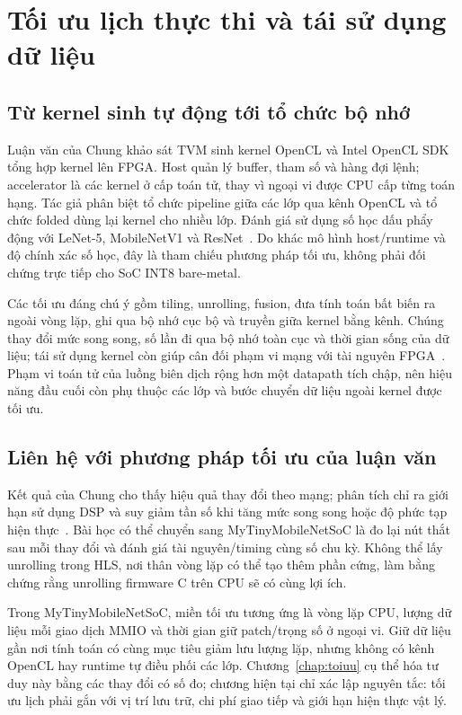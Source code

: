 \section{Tối ưu lịch thực thi và tái sử dụng dữ liệu}
\subsection{Từ kernel sinh tự động tới tổ chức bộ nhớ}
Luận văn của Chung khảo sát TVM sinh kernel OpenCL và Intel OpenCL SDK tổng hợp kernel lên FPGA. Host quản lý buffer, tham số và hàng đợi lệnh; accelerator là các kernel ở cấp toán tử, thay vì ngoại vi được CPU cấp từng toán hạng. Tác giả phân biệt tổ chức pipeline giữa các lớp qua kênh OpenCL và tổ chức folded dùng lại kernel cho nhiều lớp. Đánh giá sử dụng số học dấu phẩy động với LeNet-5, MobileNetV1 và ResNet~\cite[Chapters~1, 3, 6]{chung2021optimization}. Do khác mô hình host/runtime và độ chính xác số học, đây là tham chiếu phương pháp tối ưu, không phải đối chứng trực tiếp cho SoC INT8 bare-metal.

Các tối ưu đáng chú ý gồm tiling, unrolling, fusion, đưa tính toán bất biến ra ngoài vòng lặp, ghi qua bộ nhớ cục bộ và truyền giữa kernel bằng kênh. Chúng thay đổi mức song song, số lần đi qua bộ nhớ toàn cục và thời gian sống của dữ liệu; tái sử dụng kernel còn giúp cân đối phạm vi mạng với tài nguyên FPGA~\cite[Chapters~4--5]{chung2021optimization}. Phạm vi toán tử của luồng biên dịch rộng hơn một datapath tích chập, nên hiệu năng đầu cuối còn phụ thuộc các lớp và bước chuyển dữ liệu ngoài kernel được tối ưu.

\subsection{Liên hệ với phương pháp tối ưu của luận văn}
Kết quả của Chung cho thấy hiệu quả thay đổi theo mạng; phân tích chỉ ra giới hạn sử dụng DSP và suy giảm tần số khi tăng mức song song hoặc độ phức tạp hiện thực~\cite[Sections~6.4--6.5]{chung2021optimization}. Bài học có thể chuyển sang MyTinyMobileNetSoC là đo lại nút thắt sau mỗi thay đổi và đánh giá tài nguyên/timing cùng số chu kỳ. Không thể lấy unrolling trong HLS, nơi thân vòng lặp có thể tạo thêm phần cứng, làm bằng chứng rằng unrolling firmware C trên CPU sẽ có cùng lợi ích.

Trong MyTinyMobileNetSoC, miền tối ưu tương ứng là vòng lặp CPU, lượng dữ liệu mỗi giao dịch MMIO và thời gian giữ patch/trọng số ở ngoại vi. Giữ dữ liệu gần nơi tính toán có cùng mục tiêu giảm lưu lượng lặp, nhưng không có kênh OpenCL hay runtime tự điều phối các lớp. Chương~\ref{chap:toiuu} cụ thể hóa tư duy này bằng các thay đổi có số đo; chương hiện tại chỉ xác lập nguyên tắc: tối ưu lịch phải gắn với vị trí lưu trữ, chi phí giao tiếp và giới hạn hiện thực vật lý.
